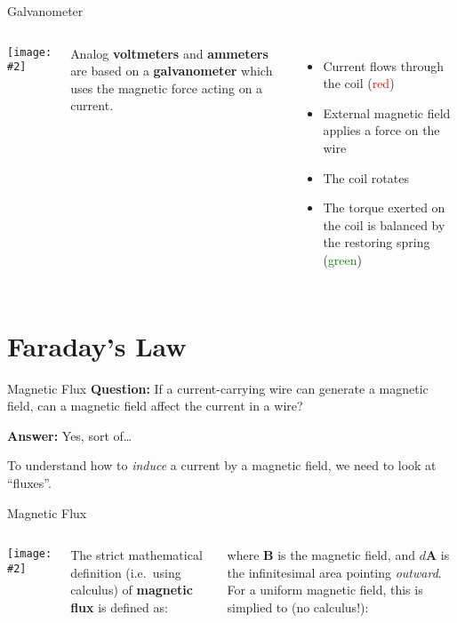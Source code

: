 \documentclass[12pt,aspectratio=169]{beamer}
\newcommand{\pic}[2]{\texttt{[image: \#2]}}
\newcommand{\mb}[1]{\mathbf{#1}}
\newcommand{\eq}[2]{\vspace{#1}{\Large\begin{displaymath}#2\end{displaymath}}}
\begin{document}
\begin{frame}{Galvanometer}
  \begin{columns}
    \centering
    \pic1{800px-Galvanometer_diagram}

    Analog \textbf{voltmeters} and \textbf{ammeters} are based on a
    \textbf{galvanometer} which uses the magnetic force acting on a current.
    \begin{itemize}
    \item Current flows through the coil (\textcolor{red}{red})
    \item External magnetic field applies a force on the wire
    \item The coil rotates
    \item The torque exerted on the coil is balanced by the restoring spring
      (\textcolor{green}{green})
    \end{itemize}
  \end{columns}
\end{frame}



\section{Faraday's Law}

\begin{frame}{Magnetic Flux}
  \textbf{Question:} If a current-carrying wire can generate a magnetic field,
  can a magnetic field affect the current in a wire?

  \vspace{.3in}\textbf{Answer:} Yes, sort of\ldots

  \vspace{.3in}To understand how to \emph{induce} a current by a magnetic field,
  we need to look at ``fluxes''.
\end{frame}



\begin{frame}{Magnetic Flux}
  \begin{columns}
    \pic1{flux2}
  

    \vspace{.2in}The strict mathematical definition (i.e.\ using calculus) of
    \textbf{magnetic flux} is defined as:
    
    \eq{-.15in}{
      \boxed{\Phi_M=\int\mb{B}\cdot d\mb{A}}
    }
    
    where $\mb{B}$ is the magnetic field, and $d\mb{A}$ is the infinitesimal
    area pointing \emph{outward}. For a uniform magnetic field, this is
    simplied to (no calculus!):

    \eq{-.2in}{
      \Phi_M=\mb{B}\cdot\mb{A}
    }
  \end{columns}
\end{frame}
\end{document}
